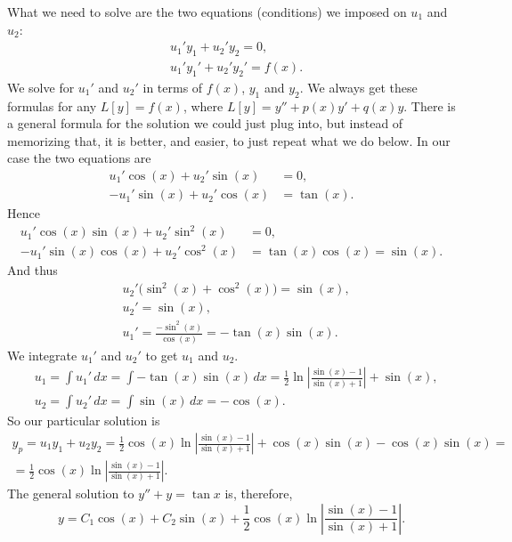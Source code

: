 \documentclass{ximera}
\begin{document}
What we need to solve are the two equations (conditions) we imposed on $u_1$ and $u_2$:
\begin{equation*}
    \begin{aligned}
        & u_1' y_1 + u_2' y_2 = 0 ,\\
        & u_1' y_1' + u_2' y_2' = f(x) .
    \end{aligned}
\end{equation*}
We solve for $u_1'$ and $u_2'$ in terms of $f(x)$, $y_1$ and $y_2$. We always get these formulas for any $L[y] = f(x)$, where $L[y] = y''+p(x)y'+q(x)y$.  There is a general formula for the solution we could just plug into, but instead of memorizing that, it is better, and easier, to just repeat what we do below.  In our case the two equations are
\begin{align*}
    u_1' \cos (x) + u_2' \sin (x) &= 0 ,\\
    -u_1' \sin (x) + u_2' \cos (x) &= \tan (x) .
\end{align*}
Hence
\begin{align*}
    u_1' \cos (x) \sin (x) + u_2' \sin^2 (x) & = 0 ,\\
    -u_1' \sin (x) \cos (x) + u_2' \cos^2 (x) & = \tan (x) \cos (x) = \sin (x) .
\end{align*}
And thus
\begin{align*}
    & u_2' \bigl(\sin^2 (x) + \cos^2 (x)\bigr) = \sin (x) , \\
    & u_2' = \sin (x) , \\
    & u_1' = \frac{- \sin^2 (x)}{\cos (x)} = - \tan (x) \sin (x) .
\end{align*}
We integrate $u_1'$ and $u_2'$ to get $u_1$ and $u_2$.
\begin{align*}
    & u_1 = \int u_1'\,dx  = \int - \tan (x) \sin (x)\,dx = \frac{1}{2} \ln \left\lvert \frac{\sin (x)-1}{\sin (x) + 1} \right\rvert + \sin (x) , \\
    & u_2 = \int u_2'\,dx  = \int \sin (x)\,dx = -\cos (x) .
\end{align*}
So our particular solution is
\begin{multline*}
    y_p = u_1 y_1 + u_2 y_2 = \frac{1}{2} \cos (x) \ln \left\lvert \frac{\sin (x)-1}{\sin (x) + 1} \right\rvert + \cos (x) \sin (x) -\cos (x) \sin (x) = \\ 
    = \frac{1}{2} \cos (x) \ln \left\lvert \frac{\sin (x)-1}{\sin (x) + 1} \right\rvert .
\end{multline*}
The general solution to $y'' + y = \tan x$ is, therefore,
\begin{equation*}
    y = C_1 \cos (x) + C_2 \sin (x) + \frac{1}{2} \cos (x) \ln \left\lvert \frac{\sin (x)-1}{\sin (x) + 1} \right\rvert .
\end{equation*}
\end{document}
